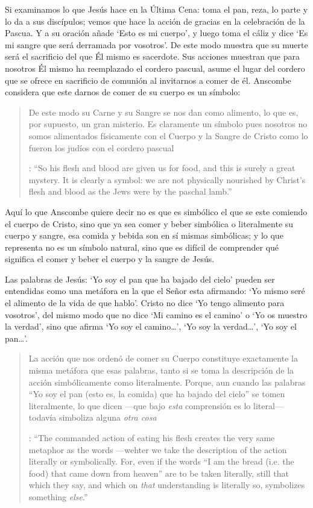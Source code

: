 Si examinamos lo que Jesús hace en la Última Cena: toma el pan, reza, lo parte y lo da a sus discípulos; vemos que hace la acción de gracias en la celebración de la Pascua. Y a su oración añade \enquote*{Esto es mi cuerpo}, y luego toma el cáliz y dice \enquote*{Es mi sangre que será derramada por vosotros}. De este modo muestra que su muerte será el sacrificio del que Él mismo es sacerdote. Sus acciones muestran que para nosotros Él mismo ha reemplazado el cordero pascual, asume el lugar del cordero que se ofrece en sacrificio de comunión al invitarnos a comer de él. Anscombe considera que este darnos de comer de su cuerpo es un símbolo: \blockquote[{\cite[110]{anscombe1981erp:ot}}: \enquote{So his flesh and blood are given us for food, and this is surely a great mystery. It is clearly a symbol: we are not physically nourished by Christ's flesh and blood as the Jews were by the paschal lamb.}]{De este modo su Carne y su Sangre se nos dan como alimento, lo que es, por supuesto, un gran misterio. Es claramente un símbolo pues nosotros no somos alimentados físicamente con el Cuerpo y la Sangre de Cristo como lo fueron los judíos con el cordero pascual}. Aquí lo que Anscombe quiere decir no es que es simbólico el que se este comiendo el cuerpo de Cristo, sino que ya sea comer y beber simbólica o literalmente su cuerpo y sangre, esa comida y bebida son en sí mismas simbólicas; y lo que representa no es un símbolo natural, sino que es difícil de comprender qué significa el comer y beber el cuerpo y la sangre de Jesús.

Las palabras de Jesús: \enquote*{Yo soy el pan que ha bajado del cielo} pueden ser entendidas como una metáfora en la que el Señor esta afirmando: \enquote*{Yo mismo seré el alimento de la vida de que hablo}. Cristo no dice \enquote*{Yo tengo alimento para vosotros}, del mismo modo que no dice \enquote*{Mi camino es el camino} o \enquote*{Yo os muestro la verdad}, sino que afirma \enquote*{Yo soy el camino\ldots}, \enquote*{Yo soy la verdad\ldots}, \enquote*{Yo soy el pan\ldots}. \blockquote[{\cite[110]{anscombe1981erp:ot}}: \enquote{The commanded action of eating his flesh creates the very same metaphor as the words ---wehter we take the description of the action literally or symbolically. For, even if the words ``I am the bread (i.e. the food) that came down from heaven'' are to be taken literally, still that which they say, and which on \emph{that} understanding is literally so, symbolizes something \emph{else}.}]{La acción que nos ordenó de comer su Cuerpo constituye exactamente la misma metáfora que esas palabras, tanto si se toma la descripción de la acción simbólicamente como literalmente. Porque, aun cuando las palabras ``Yo soy el pan (esto es, la comida) que ha bajado del cielo'' se tomen literalmente, lo que dicen ---que bajo \emph{esta} comprensión es lo literal--- todavía simboliza alguna \emph{otra cosa}}.

